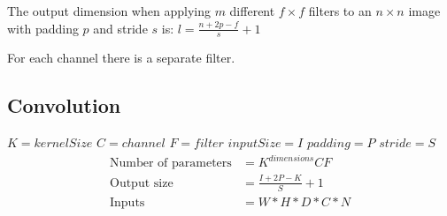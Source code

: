 The output dimension when applying $m$ different $f \times f$ filters to an $n \times n$ image with padding $p$ and stride $s$ is: $l = \frac{n + 2p - f}{s} + 1$

For each channel there is a separate filter.

\subsection*{Convolution}
    $K = kernelSize$ $C = channel$ $F = filter$ $inputSize = I$ $padding = P$
    $stride = S$ 
\begin{align*}
    \text{Number of parameters} &= K^{dimensions} C F\\
    \text{Output size} &= \frac{I + 2P - K}{S} + 1\\
    \text{Inputs} &= W * H * D * C * N
\end{align*}


